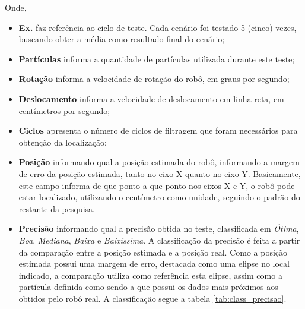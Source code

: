 Onde,
\begin{itemize}
  \item \textbf{Ex.} faz referência ao ciclo de teste. Cada cenário foi testado 5 (cinco) vezes, buscando obter a média como resultado
  final do cenário;

  \item \textbf{Partículas} informa a quantidade de partículas utilizada durante este teste;

  \item \textbf{Rotação} informa a velocidade de rotação do robô, em graus por segundo;

  \item \textbf{Deslocamento} informa a velocidade de deslocamento em linha reta, em centímetros por segundo;

  \item \textbf{Ciclos} apresenta o número de ciclos de filtragem que foram necessários para obtenção da localização;

  \item \textbf{Posição} informando qual a posição estimada do robô, informando a margem de erro da posição estimada, tanto no eixo X
  quanto no eixo Y. Basicamente, este campo informa de que ponto a que ponto nos eixos X e Y, o robô pode estar localizado, utilizando o
  centímetro como unidade, seguindo o padrão do restante da pesquisa.

  \item \textbf{Precisão} informando qual a precisão obtida no teste, classificada em \textit{Ótima}, \textit{Boa}, \textit{Mediana},
  \textit{Baixa} e \textit{Baixíssima}. A classificação da precisão é feita a partir da comparação entre a posição estimada e a posição real.
  Como a posição estimada possui uma margem de erro, destacada como uma elipse no local indicado, a comparação utiliza como referência
  esta elipse, assim como a partícula definida como sendo a que possui os dados mais próximos aos obtidos pelo robô real. A classificação
  segue a tabela \ref{tab:class_precisao}.


\end{itemize}
